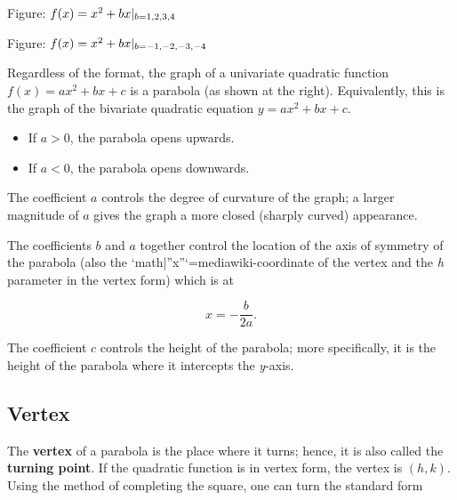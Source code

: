 Figure: $f(x) = x^2 + bx | _{b=\\{1,2,3,4\\}} $






Figure: $f(x) = x^2 + bx | _{b=\\{-1,-2,-3,-4\\}} $



Regardless of the format, the graph of a univariate quadratic function $f(x) = ax^2 + bx +
c$ is a parabola (as shown at the right). Equivalently, this is the graph of the bivariate
quadratic equation $y = ax^2 + bx + c$.



\begin{itemize}
    \item If $a > 0$, the parabola opens upwards.
    \item If $a < 0$, the parabola opens downwards.
\end{itemize}

The coefficient $a$ controls the degree of curvature of the graph; a larger magnitude of
$a$ gives the graph a more closed (sharply curved) appearance.



The coefficients $b$ and $a$ together control the location of the axis of symmetry of the
parabola (also the `{{math|''x''}}`{=mediawiki}-coordinate of the vertex and the
\textit{h} parameter in the vertex form) which is at



$$x = -\frac{b}{2a}.$$



The coefficient $c$ controls the height of the parabola; more specifically, it is the
height of the parabola where it intercepts the \textit{y}-axis.




\subsection{Vertex}
\label{sss:vert-2b5b}




The \textbf{vertex} of a parabola is the place where it turns; hence, it is also called
the \textbf{turning point}. If the quadratic function is in vertex form, the vertex is
$(h, k)$. Using the method of completing the square, one can turn the standard form



